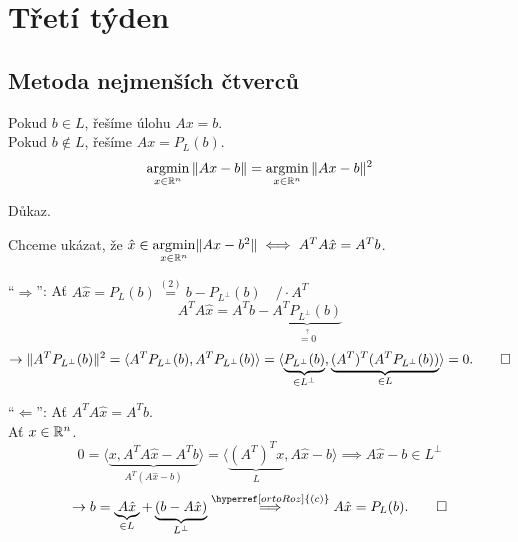 \section{Třetí týden}

\subsection{Metoda nejmenších čtverců}

\begin{multicols}{2}

\columnbreak
    Pokud $b \in L$, řešíme úlohu $Ax = b$. \\Pokud $b \not\in L$, řešíme $Ax = P_L (b)$.
    \[
        \operatorname*{argmin}_{x \in \mathbb{R}^n} \| Ax - b\| = \operatorname*{argmin}_{x \in \mathbb{R}^n} \| Ax - b\|^2
    \]
\end{multicols}
Důkaz.

Chceme ukázat, že $\hat x \in \underset{x \in \mathbb{R}^n}{\operatorname*{argmin}} \| Ax - b^2\| \iff A^T A \hat x = A^T b$.

\enquote{$\Rightarrow$}: Ať $A \hat x = P_L (b) \stackrel{\hyperref[varNer]{(2)}}{=} b - P_{L^\perp} (b) \quad / \cdot A^T$
\[
    A^T A \hat x = A^T  b - \underbrace{A^T P_{L^\perp} (b)}_{\stackrel{?}{=0}}
\]
\[
    \rightarrow \| A^T P_{L^\perp} (b)\|^2 = \langle A^T P_{L^\perp} (b), A^T P_{L^\perp} (b)\rangle = 
    \langle \underbrace{P_{L^\perp} (b)}_{\in L^\perp}, \underbrace{(A^T)^T (A^T P_{L^\perp} (b))}_{\in L}\rangle = 0. \qed
\]

\enquote{$\Leftarrow$}: Ať $A^T A \hat x = A^T b$.\\
Ať $x \in \mathbb{R}^n$.
\[
    0 = \langle \underbrace{x, A^T A \hat x - A^T b}_{A^T (A \hat x - b)}\rangle = 
    \langle \underbrace{(A^T)^T x}_L, A \hat x - b\rangle \implies A \hat x - b \in L^\perp
\]
\[
    \rightarrow b = \underbrace{A \hat x}_{\in L} + \underbrace{(b-A \hat x)}_{L^\perp} 
    \stackrel{\hyperref[ortoRoz]{(c)}}{\implies} A \hat x = P_L (b). \qed
\]

